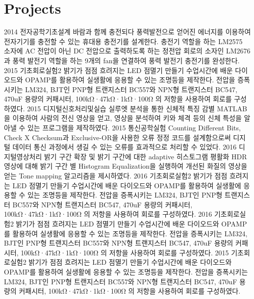 \documentclass[]{friggeri-cv}
\begin{document}
\section{Projects}

\begin{entrylist}
\entry
{2014}
{전자공학기초설계}
{ 바람과 함께 충전되다}
{풍력발전으로 얻어진 에너지를 이용하여 전자기기를 충전할 수 있는 휴대용 충전기를 설계한다. 충전기 역할을 하는 LM2575 소자에 AC 전압이 아닌 DC 전압으로 출력하도록 하는 정전압 회로의 소자인 LM2676과 풍력 발전기 역할을 하는 9개의 fan을 연결하여 풍력 발전기 충전기를 완성한다.}
\entry
{2015}
{기초회로실험2}
{ 밝기가 점점 흐려지는 LED 점멸기 만들기}
{수업시간에 배운 다이오드와 OPAMP를 활용하여 실생활에 응용할 수 있는 조명등을 제작한다. 전압을 증폭시키는 LM324, BJT인 PNP형 트랜지스터 BC557와 NPN형 트랜지스터 BC547, 470uF 용량의 커패시터, 100kΩ·47kΩ·1kΩ·100Ω 의 저항을 사용하여 회로를 구성하였다.}
\entry
{2015}
{디지털신호처리및실습}
{ 실루엣 분석을 통한 신체적 특징 감별}
{ MATLAB을 이용하여 사람의 전신 영상을 얻고, 영상을 분석하여 키와 체격 등의 신체 특성을 알아낼 수 있는 프로그램을 제작하였다. }
\entry
{2015}
{통신공학실험}
{ Counting Different Bits, Check X}
{Checksum과 Exclusive-OR을 사용한 오류 정정 코드를 설계함으로써 디지털 데이터 통신 과정에서 생길 수 있는 오류를 효과적으로 처리할 수 있었다.}
\entry
{2016}
{디지털영상처리}
{ 밝기 구간 확장 및 밝기 구간에 대한 adaptive 히스토그램 평활화 }
{ HDR 영상에 대해 밝기 구간 별 Histogram Equalization을 실행하여 개선된 화질의 영상을 얻는 Tone mapping 알고리즘을 제시하였다. }
\entry
{2016}
{기초회로실험2}
{ 밝기가 점점 흐려지는 LED 점멸기 만들기}
{수업시간에 배운 다이오드와 OPAMP를 활용하여 실생활에 응용할 수 있는 조명등을 제작한다. 전압을 증폭시키는 LM324, BJT인 PNP형 트랜지스터 BC557와 NPN형 트랜지스터 BC547, 470uF 용량의 커패시터, 100kΩ·47kΩ·1kΩ·100Ω 의 저항을 사용하여 회로를 구성하였다.}
\entry
{2016}
{기초회로실험2}
{ 밝기가 점점 흐려지는 LED 점멸기 만들기}
{수업시간에 배운 다이오드와 OPAMP를 활용하여 실생활에 응용할 수 있는 조명등을 제작한다. 전압을 증폭시키는 LM324, BJT인 PNP형 트랜지스터 BC557와 NPN형 트랜지스터 BC547, 470uF 용량의 커패시터, 100kΩ·47kΩ·1kΩ·100Ω 의 저항을 사용하여 회로를 구성하였다.}
\entry
{2015}
{기초회로실험2}
{ 밝기가 점점 흐려지는 LED 점멸기 만들기}
{수업시간에 배운 다이오드와 OPAMP를 활용하여 실생활에 응용할 수 있는 조명등을 제작한다. 전압을 증폭시키는 LM324, BJT인 PNP형 트랜지스터 BC557와 NPN형 트랜지스터 BC547, 470uF 용량의 커패시터, 100kΩ·47kΩ·1kΩ·100Ω 의 저항을 사용하여 회로를 구성하였다.}
\end{entrylist}
\end{document}
